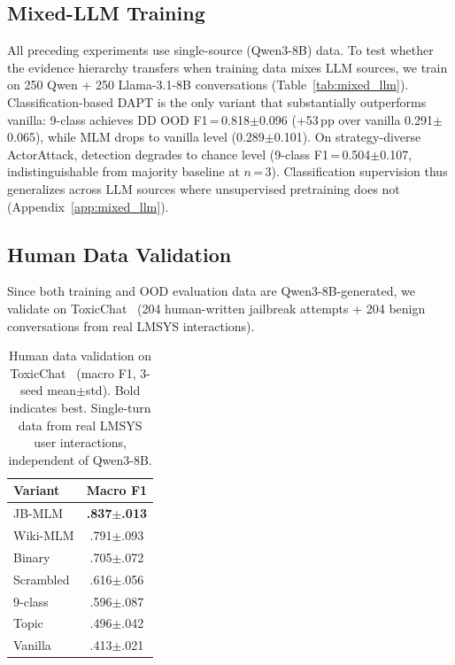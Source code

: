 \subsection{Mixed-LLM Training}

All preceding experiments use single-source (Qwen3-8B) data. To test whether the evidence hierarchy transfers when training data mixes LLM sources, we train on 250 Qwen + 250 Llama-3.1-8B conversations (Table~\ref{tab:mixed_llm}).
Classification-based DAPT is the only variant that substantially outperforms vanilla: 9-class achieves DD OOD F1\,=\,0.818$\pm$0.096 (+53\,pp over vanilla 0.291$\pm$0.065), while MLM drops to vanilla level (0.289$\pm$0.101). On strategy-diverse ActorAttack, detection degrades to chance level (9-class F1\,=\,0.504$\pm$0.107, indistinguishable from majority baseline at $n$\,=\,3).
Classification supervision thus generalizes across LLM sources where unsupervised pretraining does not (Appendix~\ref{app:mixed_llm}).

\subsection{Human Data Validation}
\label{sec:human_data}

Since both training and OOD evaluation data are Qwen3-8B-generated, we validate on ToxicChat~\citep{lin2023toxicchat} (204 human-written jailbreak attempts + 204 benign conversations from real LMSYS interactions).

\begin{table}[t]
\centering
\small
\caption{Human data validation on ToxicChat~\citep{lin2023toxicchat} (macro F1, 3-seed mean$\pm$std). Bold indicates best. Single-turn data from real LMSYS user interactions, independent of Qwen3-8B.}
\label{tab:human_data}
\begin{tabular}{@{}lc@{}}
\toprule
\textbf{Variant} & Macro F1 \\
\midrule
JB-MLM & \textbf{.837$\pm$.013} \\
Wiki-MLM & .791$\pm$.093 \\
Binary & .705$\pm$.072 \\
Scrambled & .616$\pm$.056 \\
9-class & .596$\pm$.087 \\
Topic & .496$\pm$.042 \\
\midrule
Vanilla & .413$\pm$.021 \\
\bottomrule
\end{tabular}
\end{table}

